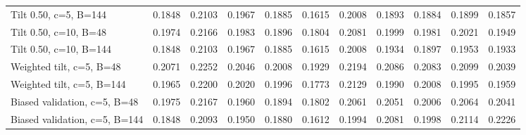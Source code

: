\begin{landscape}
\begin{longtable}{lrrrrrrrrrr}
Tilt 0.50, c=5, B=144 & 0.1848 & 0.2103 & 0.1967 & 0.1885 & 0.1615 & 0.2008 & 0.1893 & 0.1884 & 0.1899 & 0.1857 \\
Tilt 0.50, c=10, B=48 & 0.1974 & 0.2166 & 0.1983 & 0.1896 & 0.1804 & 0.2081 & 0.1999 & 0.1981 & 0.2021 & 0.1949 \\
Tilt 0.50, c=10, B=144 & 0.1848 & 0.2103 & 0.1967 & 0.1885 & 0.1615 & 0.2008 & 0.1934 & 0.1897 & 0.1953 & 0.1933 \\
Weighted tilt, c=5, B=48 & 0.2071 & 0.2252 & 0.2046 & 0.2008 & 0.1929 & 0.2194 & 0.2086 & 0.2083 & 0.2099 & 0.2039 \\
Weighted tilt, c=5, B=144 & 0.1965 & 0.2200 & 0.2020 & 0.1996 & 0.1773 & 0.2129 & 0.1990 & 0.2008 & 0.1995 & 0.1959 \\
Biased validation, c=5, B=48 & 0.1975 & 0.2167 & 0.1960 & 0.1894 & 0.1802 & 0.2061 & 0.2051 & 0.2006 & 0.2064 & 0.2041 \\
Biased validation, c=5, B=144 & 0.1848 & 0.2093 & 0.1950 & 0.1880 & 0.1612 & 0.1994 & 0.2081 & 0.1998 & 0.2114 & 0.2226 \\
\bottomrule
\end{longtable}
\end{landscape}
